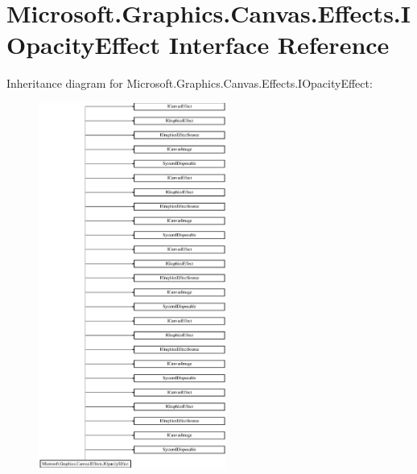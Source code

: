 \hypertarget{interface_microsoft_1_1_graphics_1_1_canvas_1_1_effects_1_1_i_opacity_effect}{}\section{Microsoft.\+Graphics.\+Canvas.\+Effects.\+I\+Opacity\+Effect Interface Reference}
\label{interface_microsoft_1_1_graphics_1_1_canvas_1_1_effects_1_1_i_opacity_effect}
Inheritance diagram for Microsoft.\+Graphics.\+Canvas.\+Effects.\+I\+Opacity\+Effect\+:\begin{figure}[H]
\begin{center}
\leavevmode
\includegraphics[height=12.000000cm]{interface_microsoft_1_1_graphics_1_1_canvas_1_1_effects_1_1_i_opacity_effect}
\end{center}
\end{figure}
